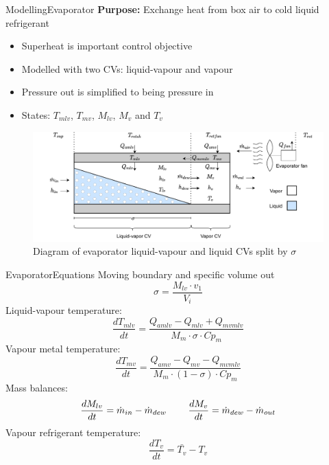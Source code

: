 \begin{frame}{Modelling}{Evaporator}
	\textbf{Purpose:} Exchange heat from box air to cold liquid refrigerant
	\begin{itemize}
		\item Superheat is important control objective
		\item Modelled with two CVs: liquid-vapour and vapour
		\item Pressure out is simplified to being pressure in
		\item States: $T_{mlv}$, $T_{mv}$, $M_{lv}$, $M_{v}$ and $T_{v}$
	\end{itemize}
	
	\vspace{0.4cm}
	\begin{figure}[h!]
		\centering
		\includegraphics[width=1\textwidth]{../Graphics/Evaporator_CV_diagram.pdf}
		\caption{Diagram of evaporator liquid-vapour and liquid CVs split by $\sigma$}
		\label{fig:evap_CV}
	\end{figure}

\end{frame}

\begin{frame}{Evaporator}{Equations}
	Moving boundary and specific volume out
	\begin{equation}
		\sigma = \frac{M_{lv} \cdot v_1}{V_i} \label{eq:Evaporator_boundary}
	\end{equation}
	Liquid-vapour temperature:
	\begin{equation}
		\frac{dT_{mlv}}{dt}  = \frac{Q_{amlv}-Q_{mlv} + Q_{mvmlv}}{M_m \cdot \sigma \cdot Cp_m} \label{eq:evap_dT_ml}
	\end{equation}
	Vapour metal temperature:
	\begin{equation}
		\frac{dT_{mv}}{dt} = \frac{Q_{amv} - Q_{mv} - Q_{mvmlv}}{M_m \cdot (1 - \sigma) \cdot Cp_m} \label{eq:evap_dT_mv}
	\end{equation}
	Mass balances:
	\begin{equation} \label{eq:evap_dMlv}
		\frac{dM_{lv}}{dt} = \dot{m}_{in} - \dot{m}_{dew} \hspace{0.8cm}  \frac{dM_v}{dt} = \dot{m}_{dew} - \dot{m}_{out}
	\end{equation}
	Vapour refrigerant temperature:
	\begin{equation}\label{eq:tv_initial}
		\frac{dT_{v}}{dt} = \bar{T_v} - T_v
	\end{equation}

\end{frame}

